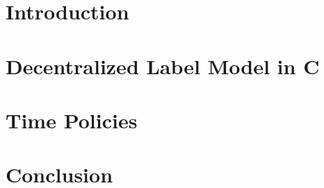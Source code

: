 %
%
%
%
%


\usetikzlibrary{arrows}
\pagestyle{empty} %
\clearpage
{} %



\cleardoublepage
{}
\pagestyle{fancy} %
\tableofcontents


\cleardoublepage

\chapter{Introduction}\label{introduction}








\chapter{Decentralized Label Model in C}\label{ctif}




\chapter{Time Policies}\label{time}





\chapter{Conclusion}\label{conclusion}


\printbibliography[heading=bibintoc]
\label{bib:mybiblio}


